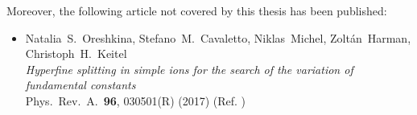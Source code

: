 \vspace{0.7cm}

\noindent
Moreover, the following article not covered by this thesis has been published:

\begin{itemize}
\item Natalia~S.~Oreshkina, Stefano~M.~Cavaletto, Niklas~Michel, Zoltán~Harman,\\Christoph~H.~Keitel \\ 
\textit{Hyperfine splitting in simple ions for the search of the variation of fundamental constants} \\ 
Phys.~Rev.~A.~\textbf{96}, 030501(R) (2017) (Ref. \cite{oreshkina2017}) \vspace*{5pt} \\
\end{itemize} 

\thispagestyle{empty}
